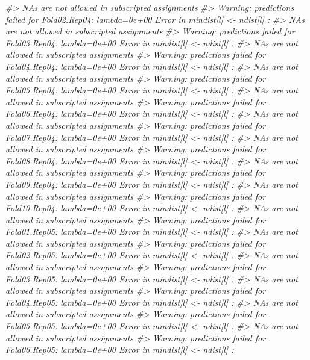 \documentclass[]{book}
\newenvironment{Shaded}{\begin{snugshade}}{\end{snugshade}}
\newcommand{\CommentTok}[1]{\textcolor[rgb]{0.56,0.35,0.01}{\textit{#1}}}
\begin{document}
\begin{Shaded}
\begin{Highlighting}[]
\CommentTok{#>   NAs are not allowed in subscripted assignments}
\CommentTok{#> Warning: predictions failed for Fold02.Rep04: lambda=0e+00 Error in mindist[l] <- ndist[l] : }
\CommentTok{#>   NAs are not allowed in subscripted assignments}
\CommentTok{#> Warning: predictions failed for Fold03.Rep04: lambda=0e+00 Error in mindist[l] <- ndist[l] : }
\CommentTok{#>   NAs are not allowed in subscripted assignments}
\CommentTok{#> Warning: predictions failed for Fold04.Rep04: lambda=0e+00 Error in mindist[l] <- ndist[l] : }
\CommentTok{#>   NAs are not allowed in subscripted assignments}
\CommentTok{#> Warning: predictions failed for Fold05.Rep04: lambda=0e+00 Error in mindist[l] <- ndist[l] : }
\CommentTok{#>   NAs are not allowed in subscripted assignments}
\CommentTok{#> Warning: predictions failed for Fold06.Rep04: lambda=0e+00 Error in mindist[l] <- ndist[l] : }
\CommentTok{#>   NAs are not allowed in subscripted assignments}
\CommentTok{#> Warning: predictions failed for Fold07.Rep04: lambda=0e+00 Error in mindist[l] <- ndist[l] : }
\CommentTok{#>   NAs are not allowed in subscripted assignments}
\CommentTok{#> Warning: predictions failed for Fold08.Rep04: lambda=0e+00 Error in mindist[l] <- ndist[l] : }
\CommentTok{#>   NAs are not allowed in subscripted assignments}
\CommentTok{#> Warning: predictions failed for Fold09.Rep04: lambda=0e+00 Error in mindist[l] <- ndist[l] : }
\CommentTok{#>   NAs are not allowed in subscripted assignments}
\CommentTok{#> Warning: predictions failed for Fold10.Rep04: lambda=0e+00 Error in mindist[l] <- ndist[l] : }
\CommentTok{#>   NAs are not allowed in subscripted assignments}
\CommentTok{#> Warning: predictions failed for Fold01.Rep05: lambda=0e+00 Error in mindist[l] <- ndist[l] : }
\CommentTok{#>   NAs are not allowed in subscripted assignments}
\CommentTok{#> Warning: predictions failed for Fold02.Rep05: lambda=0e+00 Error in mindist[l] <- ndist[l] : }
\CommentTok{#>   NAs are not allowed in subscripted assignments}
\CommentTok{#> Warning: predictions failed for Fold03.Rep05: lambda=0e+00 Error in mindist[l] <- ndist[l] : }
\CommentTok{#>   NAs are not allowed in subscripted assignments}
\CommentTok{#> Warning: predictions failed for Fold04.Rep05: lambda=0e+00 Error in mindist[l] <- ndist[l] : }
\CommentTok{#>   NAs are not allowed in subscripted assignments}
\CommentTok{#> Warning: predictions failed for Fold05.Rep05: lambda=0e+00 Error in mindist[l] <- ndist[l] : }
\CommentTok{#>   NAs are not allowed in subscripted assignments}
\CommentTok{#> Warning: predictions failed for Fold06.Rep05: lambda=0e+00 Error in mindist[l] <- ndist[l] : }

\end{Highlighting}
\end{Shaded}
\end{document}
